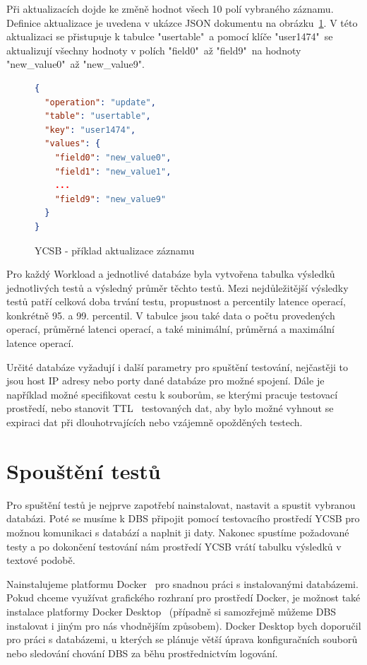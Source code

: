 \documentclass[czech,master,dept460,male,csharp,cpdeclaration]{diploma}
\begin{document}
	Při aktualizacích dojde ke změně hodnot všech 10 polí vybraného záznamu. Definice aktualizace je uvedena v ukázce JSON dokumentu na obrázku~\ref{json-ycsb-operace-update}. V této aktualizaci se přistupuje k tabulce "usertable"~a pomocí klíče "user1474"~se aktualizují všechny hodnoty v polích "field0"~až "field9"~na hodnoty "new\_value0"~až "new\_value9".
	
	\begin{figure}[H]
	\centering
	\begin{lstlisting}[language=json,firstnumber=1]
{
  "operation": "update",
  "table": "usertable",
  "key": "user1474",
  "values": {
    "field0": "new_value0",
    "field1": "new_value1",
    ...
    "field9": "new_value9"
  }
}
	\end{lstlisting}
	\caption{YCSB - příklad aktualizace záznamu}
	\label{json-ycsb-operace-update}
	\end{figure}
	
	Pro každý Workload a jednotlivé databáze byla vytvořena tabulka výsledků jednotlivých testů a výsledný průměr těchto testů. Mezi nejdůležitější výsledky testů patří celková doba trvání testu, propustnost a percentily latence operací, konkrétně 95. a 99. percentil. V tabulce jsou také data o počtu provedených operací, průměrné latenci operací, a také minimální, průměrná a maximální latence operací.
	
	Určité databáze vyžadují i další parametry pro spuštění testování, nejčastěji to jsou host IP adresy nebo porty dané databáze pro možné spojení. Dále je například možné specifikovat cestu k souborům, se kterými pracuje testovací prostředí, nebo stanovit TTL~\cite{ttl} testovaných dat, aby bylo možné vyhnout se expiraci dat při dlouhotrvajících nebo vzájemně opožděných testech.
	
	\section{Spouštění testů}\label{test-start}
	
	Pro spuštění testů je nejprve zapotřebí nainstalovat, nastavit a spustit vybranou databázi. Poté se musíme k DBS připojit pomocí testovacího prostředí YCSB pro možnou komunikaci s databází a naplnit ji daty. Nakonec spustíme požadované testy a po dokončení testování nám prostředí YCSB vrátí tabulku výsledků v textové podobě.
	
	Nainstalujeme platformu Docker~\cite{docker-console} pro snadnou práci s instalovanými databázemi. Pokud chceme využívat grafického rozhraní pro prostředí Docker, je možnost také instalace platformy Docker Desktop~\cite{docker-desktop, docker-cli} (případně si samozřejmě můžeme DBS instalovat i jiným pro nás vhodnějším způsobem). Docker Desktop bych doporučil pro práci s databázemi, u kterých se plánuje větší úprava konfiguračních souborů nebo sledování chování DBS za běhu prostřednictvím logování.
	
\end{document}
